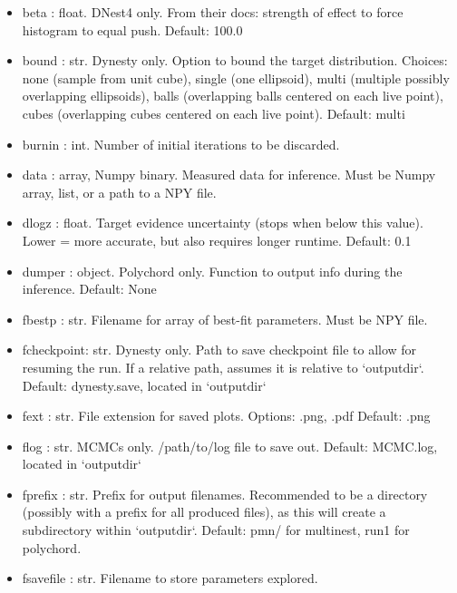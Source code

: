 \documentclass[letterpaper, 12pt]{article}
\begin{document}
\begin{itemize}
\item beta : float. DNest4 only. From their docs: strength of effect 
                    to force histogram to equal push.  Default: 100.0
\item bound : str. Dynesty only. Option to bound the target  
                   distribution. Choices: none (sample from unit  
                   cube), single (one ellipsoid), multi (multiple  
                   possibly overlapping ellipsoids), balls  
                   (overlapping balls centered on each live point),  
                   cubes (overlapping cubes centered on each live  
                   point).  Default: multi
\item burnin : int. Number of initial iterations to be discarded.
\item data : array, Numpy binary. Measured data for inference.  
                    Must be Numpy array, list, or a path to a NPY file.
\item dlogz : float. Target evidence uncertainty (stops when below  
                     this value).  Lower = more accurate, but also 
                     requires longer runtime. Default: 0.1
\item dumper : object.  Polychord only.  Function to output info 
                        during the inference.  Default: None
\item fbestp : str. Filename for array of best-fit parameters.  
                    Must be NPY file.
\item fcheckpoint: str. Dynesty only.  Path to save checkpoint file 
                        to allow for resuming the run.  If a relative path, 
                        assumes it is relative to `outputdir`.  
                        Default: dynesty.save, located in `outputdir`
\item fext : str. File extension for saved plots.  
                  Options: .png, .pdf  Default: .png
\item flog : str. MCMCs only. /path/to/log file to save out.  
                  Default: MCMC.log, located in `outputdir`
\item fprefix : str. Prefix for output filenames. Recommended to be 
                     a directory (possibly with a prefix for all 
                     produced files), as this will create a 
                     subdirectory within `outputdir`. 
                     Default: pmn/ for multinest, 
                              run1 for polychord.
\item fsavefile : str. Filename to store parameters explored.  

\end{itemize}
\end{document}
